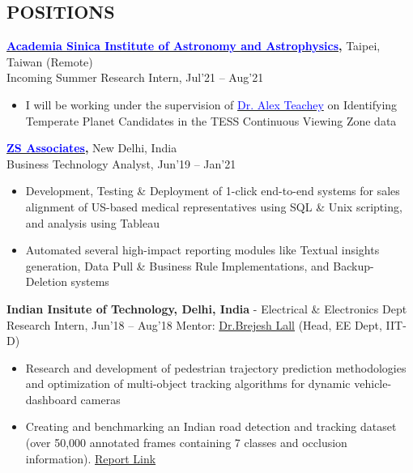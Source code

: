 \documentclass[11pt]{res} %
\newcommand{\titlegap}{5pt} %
\begin{document}
\begin{resume}

\vspace{-0.2cm}
\section{POSITIONS}
\vspace{\titlegap}


{\bf \href{https://events.asiaa.sinica.edu.tw/ssp/2021/}{\textcolor{blue}{Academia Sinica Institute of Astronomy and Astrophysics}},} Taipei, Taiwan (Remote)\\
Incoming Summer Research Intern, Jul'21 -- Aug'21
\begin{itemize}
 \item I will be working under the supervision of \href{https://alexteachey.wordpress.com/}{\textcolor{blue}{Dr. Alex Teachey}} on Identifying Temperate Planet Candidates in the TESS Continuous Viewing Zone data
\end{itemize}

\vspace{-0.1cm}
{\bf \href{https://www.zs.com/}{\textcolor{blue}{ZS Associates}},} New Delhi, India\\
Business Technology Analyst, Jun'19 -- Jan'21
\begin{itemize}
    \item Development, Testing \& Deployment of 1-click end-to-end systems for sales alignment of US-based medical representatives using SQL \& Unix scripting, and analysis using Tableau
    \item Automated several high-impact reporting modules like Textual insights generation, Data Pull \& Business Rule Implementations, and Backup-Deletion systems
\end{itemize}

\vspace{-0.1cm}
{\bf Indian Insitute of Technology, Delhi, India} - Electrical \& Electronics Dept\\
Research Intern, Jun'18 – Aug'18 \hfill Mentor: \href{https://web.iitd.ac.in/~brejesh/}{Dr.Brejesh Lall} (Head, EE Dept, IIT-D)
\begin{itemize}
    \item Research and development of pedestrian trajectory prediction methodologies and optimization of multi-object tracking algorithms for dynamic vehicle-dashboard cameras
    \item Creating and benchmarking an Indian road detection and tracking dataset (over 50,000 annotated frames containing 7 classes and occlusion information). \textcolor{blue}{\href{https://drive.google.com/file/d/1VzW1S9UInuxXegAi2ursUIjQHOWDsS6R/view?usp=sharing}{Report Link}}
\end{itemize} 


\end{resume}
\end{document}
